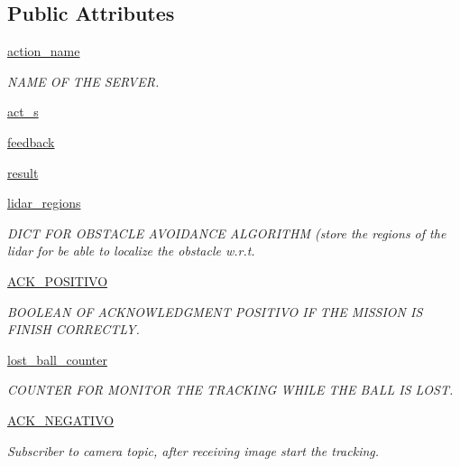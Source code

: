 \subsection*{Public Attributes}
\begin{DoxyCompactItemize}
\item 
\hyperlink{classtrackingBall_1_1Tracking_a6b17306fa008c6665ff8a5798ee27ba8}{action\+\_\+name}
\begin{DoxyCompactList}\small\item\em N\+A\+ME OF T\+HE S\+E\+R\+V\+ER. \end{DoxyCompactList}\item 
\hyperlink{classtrackingBall_1_1Tracking_a46586a7a898c757afcff8d89a7b55d77}{act\+\_\+s}
\item 
\hyperlink{classtrackingBall_1_1Tracking_a9d40ea04aba08e244a8edf175d659229}{feedback}
\item 
\hyperlink{classtrackingBall_1_1Tracking_abe3eb1a78c5f9464274125a664c694b9}{result}
\item 
\hyperlink{classtrackingBall_1_1Tracking_af4673dff355192ccd7cbd4e3676ef618}{lidar\+\_\+regions}
\begin{DoxyCompactList}\small\item\em D\+I\+CT F\+OR O\+B\+S\+T\+A\+C\+LE A\+V\+O\+I\+D\+A\+N\+CE A\+L\+G\+O\+R\+I\+T\+HM (store the regions of the lidar for be able to localize the obstacle w.\+r.\+t. \end{DoxyCompactList}\item 
\hyperlink{classtrackingBall_1_1Tracking_aadfc96c3a6be143bb62858a7ac2fc840}{A\+C\+K\+\_\+\+P\+O\+S\+I\+T\+I\+VO}
\begin{DoxyCompactList}\small\item\em B\+O\+O\+L\+E\+AN OF A\+C\+K\+N\+O\+W\+L\+E\+D\+G\+M\+E\+NT P\+O\+S\+I\+T\+I\+VO IF T\+HE M\+I\+S\+S\+I\+ON IS F\+I\+N\+I\+SH C\+O\+R\+R\+E\+C\+T\+LY. \end{DoxyCompactList}\item 
\hyperlink{classtrackingBall_1_1Tracking_a89db2b56bfd79bbbac1fd1af937e25f8}{lost\+\_\+ball\+\_\+counter}
\begin{DoxyCompactList}\small\item\em C\+O\+U\+N\+T\+ER F\+OR M\+O\+N\+I\+T\+OR T\+HE T\+R\+A\+C\+K\+I\+NG W\+H\+I\+LE T\+HE B\+A\+LL IS L\+O\+ST. \end{DoxyCompactList}\item 
\hyperlink{classtrackingBall_1_1Tracking_a7ce6a966db6cba83ba1ade3c1e7408a1}{A\+C\+K\+\_\+\+N\+E\+G\+A\+T\+I\+VO}
\begin{DoxyCompactList}\small\item\em Subscriber to camera topic, after receiving image start the tracking. \end{DoxyCompactList}\item 

\end{DoxyCompactItemize}
